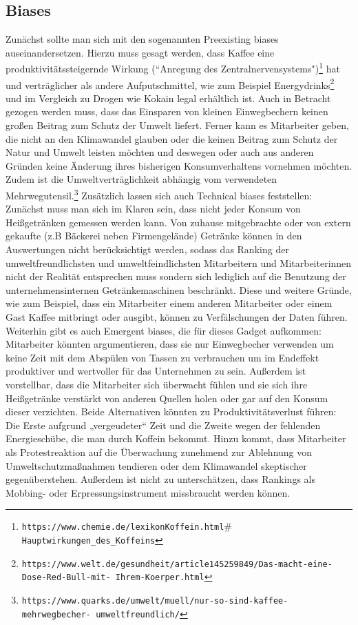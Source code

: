 \documentclass[a4paper,12pt,]{article}
\begin{document}
\subsection{Biases}
Zunächst sollte man sich mit den sogenannten Preexisting
biases auseinandersetzen. Hierzu muss gesagt werden, dass Kaffee eine
produktivitätssteigernde Wirkung (``Anregung des Zentralnervensystems")\footnote{\tt https://www.chemie.de/lexikonKoffein.html$\#$Hauptwirkungen\_des\_Koffeins}
hat und verträglicher als andere Aufputschmittel, wie zum Beispiel Energydrinks\footnote{\tt https://www.welt.de/gesundheit/article145259849/Das-macht-eine-Dose-Red-Bull-mit-
Ihrem-Koerper.html} und im Vergleich zu Drogen wie Kokain legal erhältlich ist.
Auch in Betracht gezogen werden muss, dass das Einsparen von kleinen
Einwegbechern keinen großen Beitrag zum Schutz der Umwelt liefert.
Ferner kann es Mitarbeiter geben, die nicht an den Klimawandel glauben
oder die keinen Beitrag zum Schutz der Natur und Umwelt leisten
möchten und deswegen oder auch aus anderen Gründen keine Änderung
ihres bisherigen Konsumverhaltens vornehmen möchten. Zudem ist die
Umweltverträglichkeit abhängig vom verwendeten Mehrwegutensil.\footnote{\tt https://www.quarks.de/umwelt/muell/nur-so-sind-kaffee-mehrwegbecher-
umweltfreundlich/}
Zusätzlich lassen sich auch Technical biases feststellen: Zunächst
muss man sich im Klaren sein, dass nicht jeder Konsum von
Heißgetränken gemessen werden kann. Von zuhause mitgebrachte oder
von extern gekaufte (z.B Bäckerei neben Firmengelände) Getränke
können in den Auswertungen nicht berücksichtigt werden, sodass das
Ranking der umweltfreundlichsten und umweltfeindlichsten Mitarbeitern
und Mitarbeiterinnen nicht der Realität entsprechen muss sondern sich
lediglich auf die Benutzung der unternehmensinternen
Getränkemaschinen beschränkt. Diese und weitere Gründe, wie zum
Beispiel, dass ein Mitarbeiter einem anderen Mitarbeiter oder einem Gast
Kaffee mitbringt oder ausgibt, können zu Verfälschungen der Daten
führen.
Weiterhin gibt es auch Emergent biases, die für dieses Gadget
aufkommen: Mitarbeiter könnten argumentieren, dass sie nur Einwegbecher verwenden um keine Zeit mit dem Abspülen von Tassen zu
verbrauchen um im Endeffekt produktiver und wertvoller für das
Unternehmen zu sein. Außerdem ist vorstellbar, dass die Mitarbeiter sich
überwacht fühlen und sie sich ihre Heißgetränke verstärkt von anderen
Quellen holen oder gar auf den Konsum dieser verzichten. Beide
Alternativen könnten zu Produktivitätsverlust führen: Die Erste aufgrund
„vergeudeter“ Zeit und die Zweite wegen der fehlenden Energieschübe,
die man durch Koffein bekommt. Hinzu kommt, dass Mitarbeiter als
Protestreaktion auf die Überwachung zunehmend zur Ablehnung von
Umweltschutzmaßnahmen tendieren oder dem Klimawandel skeptischer
gegenüberstehen. Außerdem ist nicht zu unterschätzen, dass Rankings
als Mobbing- oder Erpressungsinstrument missbraucht werden können.
\end{document}
